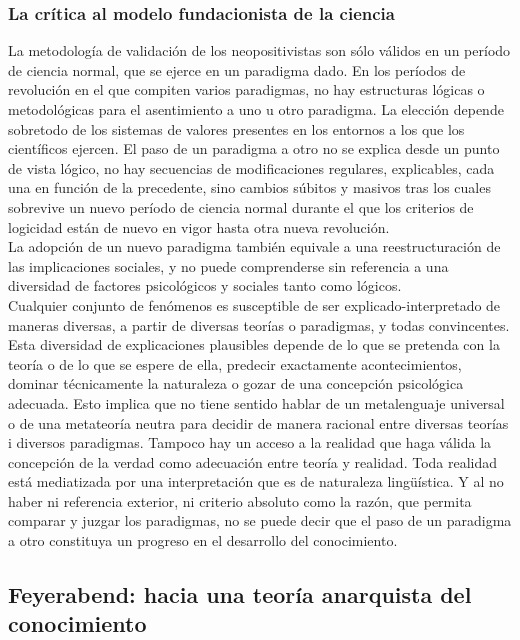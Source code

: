 \documentclass[a4paper, 11pt, twocolumn, spanish]{article}
\begin{document}
\subsubsection{La crítica al modelo fundacionista de la ciencia}
\label{sec:orgad65e8d}
La metodología de validación de los neopositivistas son sólo válidos
en un período de ciencia normal, que se ejerce en un paradigma
dado. En los períodos de revolución en el que compiten varios
paradigmas, no hay estructuras lógicas o metodológicas para el
asentimiento a uno u otro paradigma. La elección depende sobretodo de
los sistemas de valores presentes en los entornos a los que los
científicos ejercen. El paso de un paradigma a otro no se explica desde
un punto de vista lógico, no hay secuencias de modificaciones
regulares, explicables, cada una en función de la precedente, sino
cambios súbitos y masivos tras los cuales sobrevive un nuevo período
de ciencia normal durante el que los criterios de logicidad están de
nuevo en vigor hasta otra nueva revolución.\\[0pt]
La adopción de un nuevo paradigma también equivale a una
reestructuración de las implicaciones sociales, y no puede
comprenderse sin referencia a una diversidad de factores psicológicos
y sociales tanto como lógicos.\\[0pt]

Cualquier conjunto de fenómenos es susceptible de ser
explicado-interpretado de maneras diversas, a partir de diversas
teorías o paradigmas, y todas convincentes. Esta diversidad de
explicaciones plausibles depende de lo que se pretenda con la teoría o
de lo que se espere de ella, predecir exactamente acontecimientos,
dominar técnicamente la naturaleza o gozar de una concepción
psicológica adecuada. Esto implica que no tiene sentido hablar de un
metalenguaje universal o de una metateoría neutra para decidir de
manera racional entre diversas teorías i diversos paradigmas. Tampoco
hay un acceso a la realidad que haga válida la concepción de la verdad
como adecuación entre teoría y realidad. Toda realidad está
mediatizada por una interpretación que es de naturaleza lingüística. Y
al no haber ni referencia exterior, ni criterio absoluto como la
razón, que permita comparar y juzgar los paradigmas, no se puede decir
que el paso de un paradigma a otro constituya un progreso en el
desarrollo del conocimiento.

\subsection{Feyerabend: hacia una teoría anarquista del conocimiento}
\label{sec:org91f4a41}
\end{document}
